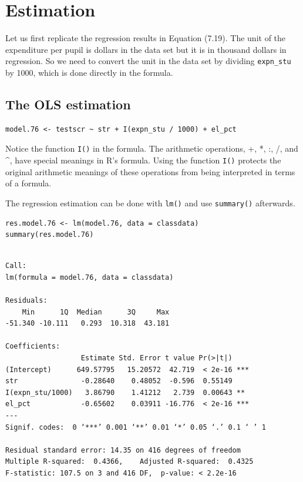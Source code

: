 \documentclass[11pt]{article}
\begin{document}
\section{Estimation}
\label{sec:org55b9542}
Let us first replicate the regression results in Equation (7.19). The
unit of the expenditure per pupil is dollars in the data set but it is
in thousand dollars in regression. So we need to convert the unit in
the data set by dividing \texttt{expn\_stu} by 1000, which is done directly in
the formula.
\subsection*{The OLS estimation}
\label{sec:org3752626}

\begin{verbatim}
model.76 <- testscr ~ str + I(expn_stu / 1000) + el_pct
\end{verbatim}

Notice the function \texttt{I()} in the formula. The arithmetic operations,
+, *, :, /, and \^{}, have special meanings in R's formula. Using the
function \texttt{I()} protects the original arithmetic meanings of these
operations from being interpreted in terms of a formula.

The regression estimation can be done with \texttt{lm()} and use \texttt{summary()}
afterwards.

\begin{verbatim}
res.model.76 <- lm(model.76, data = classdata)
summary(res.model.76)
\end{verbatim}

\begin{verbatim}

Call:
lm(formula = model.76, data = classdata)

Residuals:
    Min      1Q  Median      3Q     Max
-51.340 -10.111   0.293  10.318  43.181

Coefficients:
                  Estimate Std. Error t value Pr(>|t|)
(Intercept)      649.57795   15.20572  42.719  < 2e-16 ***
str               -0.28640    0.48052  -0.596  0.55149
I(expn_stu/1000)   3.86790    1.41212   2.739  0.00643 **
el_pct            -0.65602    0.03911 -16.776  < 2e-16 ***
---
Signif. codes:  0 ‘***’ 0.001 ‘**’ 0.01 ‘*’ 0.05 ‘.’ 0.1 ‘ ’ 1

Residual standard error: 14.35 on 416 degrees of freedom
Multiple R-squared:  0.4366,	Adjusted R-squared:  0.4325
F-statistic: 107.5 on 3 and 416 DF,  p-value: < 2.2e-16
\end{verbatim}
\end{document}
